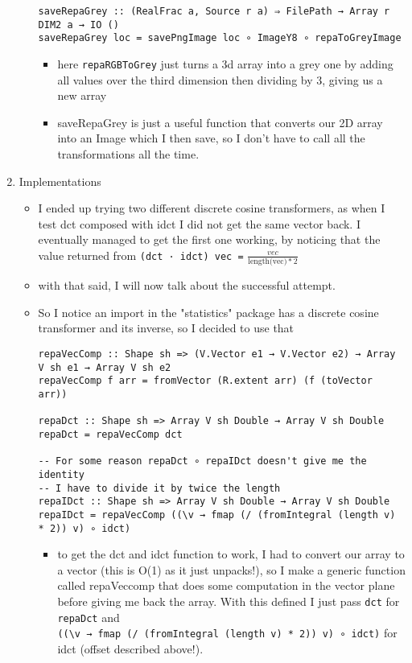 \documentclass{article}
\begin{document}
\begin{enumerate}
\begin{itemize}
\begin{verbatim}
saveRepaGrey :: (RealFrac a, Source r a) ⇒ FilePath → Array r DIM2 a → IO ()
saveRepaGrey loc = savePngImage loc ∘ ImageY8 ∘ repaToGreyImage
\end{verbatim}
\begin{itemize}
\item here \texttt{repaRGBToGrey} just turns a 3d array into a grey one by
adding all values over the third dimension then dividing by 3,
giving us a new array
\item saveRepaGrey is just a useful function that converts our 2D array
into an Image which I then save, so I don't have to call all the
transformations all the time.
\end{itemize}
\end{itemize}
\item Implementations
\label{sec-1-2}
\begin{itemize}
\item I ended up trying two different discrete cosine transformers, as
when I test dct composed with idct Ι did not get the same vector
back. Ι eventually managed to get the first one working, by noticing
that the value returned from \texttt{(dct · idct) vec =} $\frac{vec}{\text{length(vec)} * 2}$
\item with that said, Ι will now talk about the successful attempt.
\item So I notice an import in the "statistics" package has a discrete
cosine transformer and its inverse, so Ι decided to use that
\begin{verbatim}
repaVecComp :: Shape sh => (V.Vector e1 → V.Vector e2) → Array V sh e1 → Array V sh e2
repaVecComp f arr = fromVector (R.extent arr) (f (toVector arr))

repaDct :: Shape sh => Array V sh Double → Array V sh Double
repaDct = repaVecComp dct

-- For some reason repaDct ∘ repaIDct doesn't give me the identity
-- Ι have to divide it by twice the length
repaIDct :: Shape sh => Array V sh Double → Array V sh Double
repaIDct = repaVecComp ((\v → fmap (/ (fromIntegral (length v) * 2)) v) ∘ idct)
\end{verbatim}
\begin{itemize}
\item to get the dct and idct function to work, Ι had to convert our array
to a vector (this is O(1) as it just unpacks!), so I make a
generic function called repaVeccomp that does some computation in
the vector plane before giving me back the array. With this
defined I just pass \texttt{dct} for \texttt{repaDct} and \\ \texttt{((\textbackslash{}v → fmap (/
    (fromIntegral (length v) * 2)) v) ∘ idct)} for idct (offset
described above!).
\end{itemize}


\end{itemize}
\end{enumerate}
\end{document}
